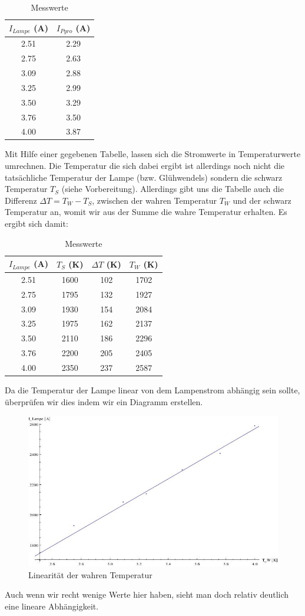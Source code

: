 \documentclass[12pt,twoside,a4paper]{article}
\begin{document}
\begin{table}[H]
\centering
\caption{Messwerte}
	\begin{tabular}{c|c}
   $I_{Lampe}$ (A) & $I_{Pyro}$ (A)\\
		\hline
	 2.51 & 2.29\\
	 2.75 & 2.63\\
	 3.09 & 2.88\\
	 3.25 & 2.99\\
	 3.50 & 3.29\\
	 3.76 & 3.50\\
	 4.00 & 3.87\\
	\end{tabular}
\end{table}

Mit Hilfe einer gegebenen Tabelle, lassen sich die Stromwerte in Temperaturwerte umrechnen. Die Temperatur die sich dabei ergibt ist allerdings noch nicht die tatsächliche Temperatur der Lampe (bzw. Glühwendels) sondern die schwarz Temperatur $T_S$ (siehe Vorbereitung). Allerdings gibt uns die Tabelle auch die Differenz $\Delta T = T_W - T_S$, zwischen der wahren Temperatur $T_W$ und der schwarz Temperatur an, womit wir aus der Summe die wahre Temperatur erhalten. Es ergibt sich damit:

\begin{table}[H]
\centering
\caption{Messwerte}
	\begin{tabular}{c|c|c|c}
   $I_{Lampe}$ (A) & $T_S$ (K) & $\Delta T$ (K) & $T_W$ (K)\\
		\hline
	 2.51 & 1600 & 102 & 1702\\
	 2.75 & 1795 & 132 & 1927\\
	 3.09 & 1930 & 154 & 2084\\
	 3.25 & 1975 & 162 & 2137\\
	 3.50 & 2110 & 186 & 2296\\
	 3.76 & 2200 & 205 & 2405\\
	 4.00 & 2350 & 237 & 2587\\
	\end{tabular}
\end{table}

Da die Temperatur der Lampe linear von dem Lampenstrom abhängig sein sollte, überprüfen wir dies indem wir ein Diagramm erstellen.

\begin{figure}[H]
		\centering
		\includegraphics[scale=.6]{bilder/waerme_3.jpeg} 
		\caption{Linearität der wahren Temperatur}
	\end{figure}
  
  Auch wenn wir recht wenige Werte hier haben, sieht man doch relativ deutlich eine lineare Abhängigkeit.
\end{document}
